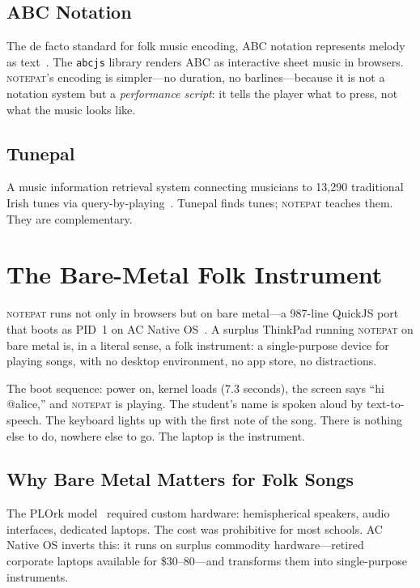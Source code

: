 \documentclass[10pt,letterpaper,twocolumn]{article}
\newcommand{\np}{\textsc{notepat}}
\begin{document}
\subsection{ABC Notation}
The de facto standard for folk music encoding, ABC notation represents melody as text~\citep{walshaw2011abc}. The \texttt{abcjs} library renders ABC as interactive sheet music in browsers. \np{}'s encoding is simpler---no duration, no barlines---because it is not a notation system but a \emph{performance script}: it tells the player what to press, not what the music looks like.

\subsection{Tunepal}
A music information retrieval system connecting musicians to 13,290 traditional Irish tunes via query-by-playing~\citep{duggan2009tunepal}. Tunepal finds tunes; \np{} teaches them. They are complementary.

\section{The Bare-Metal Folk Instrument}

\np{} runs not only in browsers but on bare metal---a 987-line QuickJS port that boots as PID~1 on AC Native OS~\citep{scudder2026os}. A surplus ThinkPad running \np{} on bare metal is, in a literal sense, a folk instrument: a single-purpose device for playing songs, with no desktop environment, no app store, no distractions.

The boot sequence: power on, kernel loads (7.3 seconds), the screen says ``hi @alice,'' and \np{} is playing. The student's name is spoken aloud by text-to-speech. The keyboard lights up with the first note of the song. There is nothing else to do, nowhere else to go. The laptop is the instrument.

\subsection{Why Bare Metal Matters for Folk Songs}

The PLOrk model~\citep{scudder2026plork} required custom hardware: hemispherical speakers, audio interfaces, dedicated laptops. The cost was prohibitive for most schools. AC Native OS inverts this: it runs on surplus commodity hardware---retired corporate laptops available for \$30--80---and transforms them into single-purpose instruments.
\end{document}
